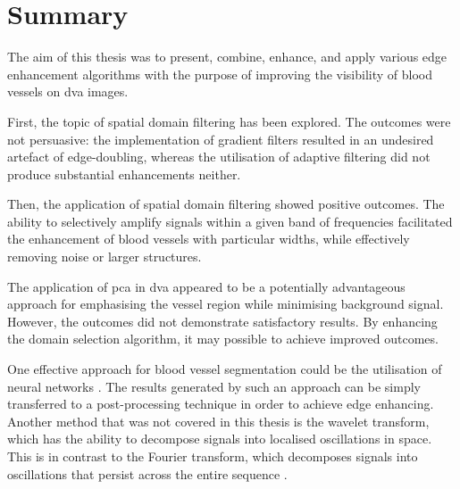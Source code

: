 \chapter*{Summary}

The aim of this thesis was to present, combine, enhance, and apply various edge enhancement algorithms with the purpose of improving the visibility of blood vessels on \gls{dva} images.

First, the topic of spatial domain filtering has been explored. The outcomes were not persuasive: the implementation of gradient filters resulted in an undesired artefact of edge-doubling, whereas the utilisation of adaptive filtering did not produce substantial enhancements neither.

Then, the application of spatial domain filtering showed positive outcomes. The ability to selectively amplify signals within a given band of frequencies facilitated the enhancement of blood vessels with particular widths, while effectively removing noise or larger structures.

The application of \gls{pca} in \gls{dva} appeared to be a potentially advantageous approach for emphasising the vessel region while minimising background signal. However, the outcomes did not demonstrate satisfactory results. By enhancing the domain selection algorithm, it may possible to achieve improved outcomes.

One effective approach for blood vessel segmentation could be the utilisation of neural networks \cite{nasr2018segmentation}. The results generated by such an approach can be simply transferred to a post-processing technique in order to achieve edge enhancing. Another method that was not covered in this thesis is the wavelet transform, which has the ability to decompose signals into localised oscillations in space. This is in contrast to the Fourier transform, which decomposes signals into oscillations that persist across the entire sequence \cite{akram2009blood}.



